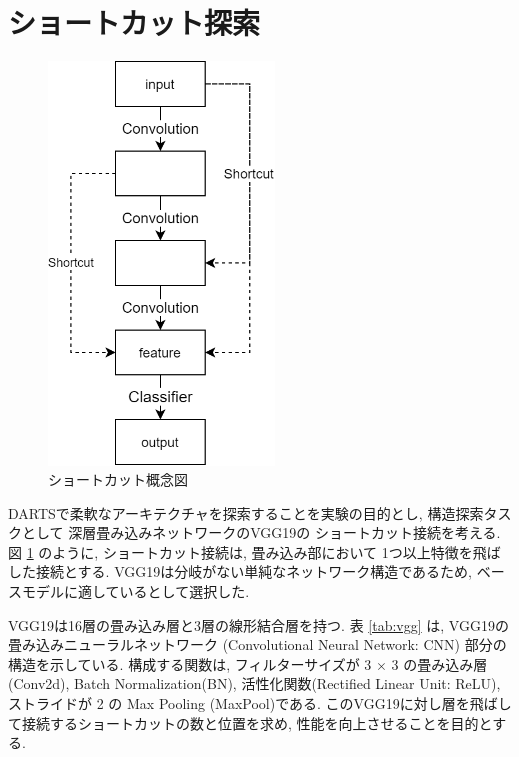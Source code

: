 \newpage
\changeindent{0cm}
\section{ショートカット探索}
\label{sec:pred}
\changeindent{2cm}

\begin{figure}[t]
  \begin{center}
    \includegraphics[clip,width=6cm]{./fig/03.pred/image.png}
  \end{center}
  \caption{ショートカット概念図}
  \label{fig:image}
\end{figure}

DARTSで柔軟なアーキテクチャを探索することを実験の目的とし, 構造探索タスクとして
深層畳み込みネットワークのVGG19\cite{Simonyan15}の
ショートカット接続\cite{mao2016image}を考える.
図 \ref{fig:image} のように, ショートカット接続は,
畳み込み部において 1つ以上特徴を飛ばした接続とする.
VGG19は分岐がない単純なネットワーク構造であるため, ベースモデルに適しているとして選択した.

VGG19は16層の畳み込み層と3層の線形結合層を持つ.
表 \ref{tab:vgg} は, VGG19の畳み込みニューラルネットワーク
(Convolutional Neural Network: CNN) 部分の構造を示している.
構成する関数は, フィルターサイズが 3 $\times$ 3 の畳み込み層(Conv2d),
Batch Normalization(BN)\cite{Ioffe2015BatchNA},
活性化関数(Rectified Linear Unit: ReLU),
ストライドが 2 の Max Pooling (MaxPool)である.
このVGG19に対し層を飛ばして接続するショートカットの数と位置を求め,
性能を向上させることを目的とする.

